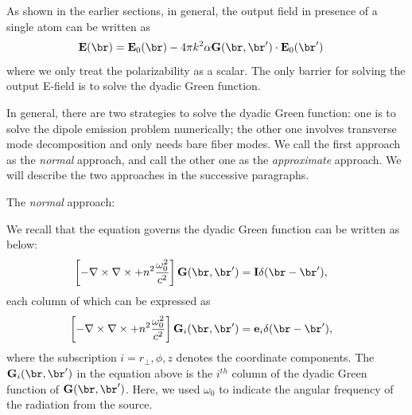\documentclass[]{report}
\begin{document}
As shown in the earlier sections, in general, the output field in presence of a single atom can be written as
\begin{align}
\mathbf{E}(\br) 
&=\mathbf{E}_0(\br)-4\pi k^2\alpha \mathbf{G}(\br,\br')\cdot \mathbf{E}_0(\br')
\end{align}
where we only treat the polarizability as a scalar. The only barrier for solving the output E-field is to solve the dyadic Green function.

In general, there are two strategies to solve the dyadic Green function: one is to solve the dipole emission problem numerically; the other one involves transverse mode decomposition and only needs bare fiber modes. We call the first approach as the \textit{normal} approach, and call the other one as the \textit{approximate} approach. We will describe the two approaches in the successive paragraphs. 

The \textit{normal} approach:

We recall that the equation governs the dyadic Green function can be written as below:
\begin{align}
\left[ -\nabla\times\nabla\times + n^2\frac{\omega^2_0}{c^2} \right] \mathbf{G}(\br,\br') &= \mathbf{I}\delta(\br-\br'),
\end{align}
each column of which can be expressed as
\begin{align}
\left[ -\nabla\times\nabla\times + n^2\frac{\omega^2_0}{c^2} \right] \mathbf{G}_i(\br,\br') &= \mathbf{e}_i\delta(\br-\br'), \label{eq:Gi}
\end{align}
where the subscription $ i=r\!_\perp,\phi,z $ denotes the coordinate components. The $ \mathbf{G}_i(\br,\br') $ in the equation above is the $ i^{th} $ column of the dyadic Green function of $ \mathbf{G}(\br,\br') $. Here, we used $\omega_0$ to indicate the angular frequency of the radiation from the source.  
\end{document}
